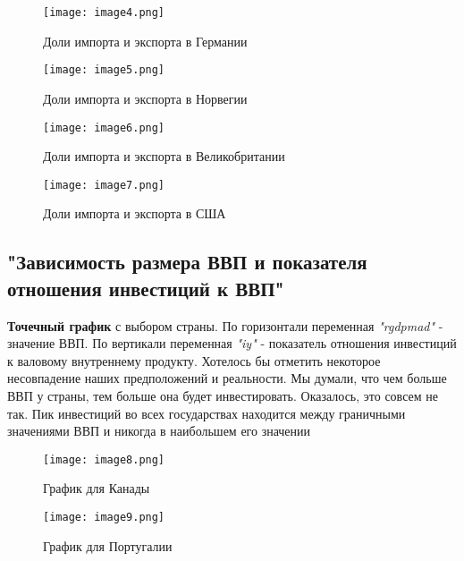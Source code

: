 \documentclass[12pt]{article}
\begin{document}
\begin{figure}
  \begin{minipage}[t]{0.49\linewidth}
    \centering
    \texttt{[image: image4.png]}
    \caption{Доли импорта и экспорта в Германии}
    \label{fig:img1}
  \end{minipage}
  \hfill
  \begin{minipage}[t]{0.49\linewidth}
    \centering
    \texttt{[image: image5.png]}
    \caption{Доли импорта и экспорта в Норвегии}
    \label{fig:img2}
  \end{minipage}
  \hfill
  \begin{minipage}[t]{0.49\linewidth}
    \centering
    \texttt{[image: image6.png]}
    \caption{Доли импорта и экспорта в Великобритании}
    \label{fig:img2}
  \end{minipage}
  \hfill
  \begin{minipage}[t]{0.49\linewidth}
    \centering
    \texttt{[image: image7.png]}
    \caption{Доли импорта и экспорта в США}
    \label{fig:img2}
  \end{minipage}
\end{figure}


\vfill
\subsection{"Зависимость размера ВВП и показателя отношения инвестиций к ВВП"{}}

\textbf{Точечный график} с выбором страны. По горизонтали переменная \textit{"rgdpmad"{}} - значение ВВП. По вертикали переменная \textit{"iy"{}} - показатель отношения инвестиций к валовому внутреннему продукту. Хотелось бы отметить некоторое несовпадение наших предположений и реальности. Мы думали, что чем больше ВВП у страны, тем больше она будет инвестировать. Оказалось, это совсем не так. Пик инвестиций во всех государствах находится между граничными значениями ВВП и никогда в наибольшем его значении

\begin{figure}[h]
    \centering
    \texttt{[image: image8.png]} 
    \caption{График для Канады}
    \label{fig:img1}
  \end{figure}
\newpage
\begin{figure}[h]
    \centering
    \texttt{[image: image9.png]} 
    \caption{График для Португалии}
    \label{fig:img1}
  \end{figure}
\end{document}
